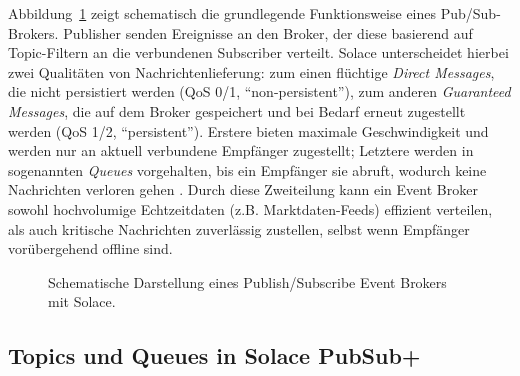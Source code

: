 Abbildung \ref{fig:broker-arch} zeigt schematisch die grundlegende Funktionsweise eines Pub/Sub-Brokers. Publisher senden Ereignisse an den Broker, der diese basierend auf Topic-Filtern an die verbundenen Subscriber verteilt. Solace unterscheidet hierbei zwei Qualitäten von Nachrichtenlieferung: zum einen flüchtige \textit{Direct Messages}, die nicht persistiert werden (QoS 0/1, “non-persistent”), zum anderen \textit{Guaranteed Messages}, die auf dem Broker gespeichert und bei Bedarf erneut zugestellt werden (QoS 1/2, “persistent”). Erstere bieten maximale Geschwindigkeit und werden nur an aktuell verbundene Empfänger zugestellt; Letztere werden in sogenannten \textit{Queues} vorgehalten, bis ein Empfänger sie abruft, wodurch keine Nachrichten verloren gehen \cite{SolaceDirectGuaranteed}. Durch diese Zweiteilung kann ein Event Broker sowohl hochvolumige Echtzeitdaten (z.B. Marktdaten-Feeds) effizient verteilen, als auch kritische Nachrichten zuverlässig zustellen, selbst wenn Empfänger vorübergehend offline sind.

\begin{figure}[h]
\centering
{}
\caption{Schematische Darstellung eines Publish/Subscribe Event Brokers mit Solace.}
\label{fig:broker-arch}
\end{figure}

\subsection{Topics und Queues in Solace PubSub+}

